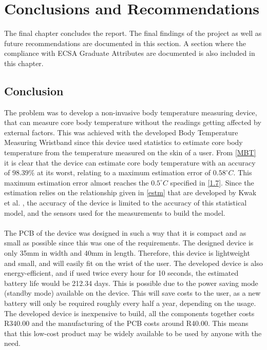 \chapter{Conclusions and Recommendations}\label{Ch6}
The final chapter concludes the report. The final findings of the project as well as future recommendations are documented in this section. A section where the compliance with ECSA Graduate Attributes are documented is also included in this chapter.

\section{Conclusion}
The problem was to develop a non-invasive body temperature measuring device, that can measure core body temperature without the readings getting affected by external factors. This was achieved with the developed Body Temperature Measuring Wristband since this device used statistics to estimate core body temperature from the temperature measured on the skin of a user. From \autoref{MBT} it is clear that the device can estimate core body temperature with an accuracy of $ 98.39 \% $ at its worst, relating to a maximum estimation error of $ 0.58^{\circ} C $. This maximum estimation error almost reaches the $ 0.5^{\circ} C $ specified in \autoref{1.7}. Since the estimation relies on the relationship given in \autoref{estm} that are developed by Kwak et al. \cite{Kwak2019}, the accuracy of the device is limited to the accuracy of this statistical model, and the sensors used for the measurements to build the model. 
\\
\\
The PCB of the device was designed in such a way that it is compact and as small as possible since this was one of the requirements. The designed device is only 35mm in width and 40mm in length. Therefore, this device is lightweight and small, and will easily fit on the wrist of the user.  The developed device is also energy-efficient, and if used twice every hour for 10 seconds, the estimated battery life would be 212.34 days. This is possible due to the power saving mode (standby mode) available on the device. This will save costs to the user, as a new battery will only be required roughly every half a year, depending on the usage. The developed device is inexpensive to build, all the components together costs R340.00 and the manufacturing of the PCB costs around R40.00. This means that this low-cost product may be widely available to be used by anyone with the need. 
\\
